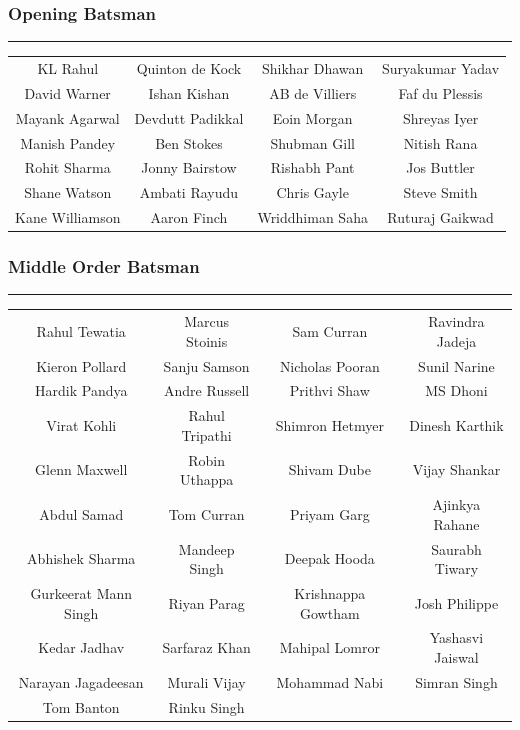 \documentclass[12pt]{article}
\begin{document}
\subsubsection*{Opening Batsman}
\hrule
\begin{tabular}{c | c | c | c}
	KL Rahul & Quinton de Kock & Shikhar Dhawan & Suryakumar Yadav \\
	David Warner & Ishan Kishan & AB de Villiers & Faf du Plessis \\
	Mayank Agarwal & Devdutt Padikkal & Eoin Morgan & Shreyas Iyer \\
	Manish Pandey & Ben Stokes & Shubman Gill & Nitish Rana \\
	Rohit Sharma & Jonny Bairstow & Rishabh Pant & Jos Buttler \\
	Shane Watson & Ambati Rayudu & Chris Gayle & Steve Smith \\
	Kane Williamson & Aaron Finch & Wriddhiman Saha & Ruturaj Gaikwad \\
\end{tabular}


\subsubsection*{Middle Order Batsman}
\hrule
\begin{tabular}{c | c | c | c}
	Rahul Tewatia & Marcus Stoinis & Sam Curran & Ravindra Jadeja \\
	Kieron Pollard & Sanju Samson & Nicholas Pooran & Sunil Narine \\
	Hardik Pandya & Andre Russell & Prithvi Shaw & MS Dhoni \\
	Virat Kohli & Rahul Tripathi & Shimron Hetmyer & Dinesh Karthik \\
	Glenn Maxwell & Robin Uthappa & Shivam Dube & Vijay Shankar \\
	Abdul Samad & Tom Curran & Priyam Garg & Ajinkya Rahane \\
	Abhishek Sharma & Mandeep Singh & Deepak Hooda & Saurabh Tiwary \\
	Gurkeerat Mann Singh & Riyan Parag & Krishnappa Gowtham & Josh Philippe \\
	Kedar Jadhav & Sarfaraz Khan & Mahipal Lomror & Yashasvi Jaiswal \\
	Narayan Jagadeesan & Murali Vijay & Mohammad Nabi & Simran Singh \\
	Tom Banton & Rinku Singh \\
\end{tabular}
\end{document}
